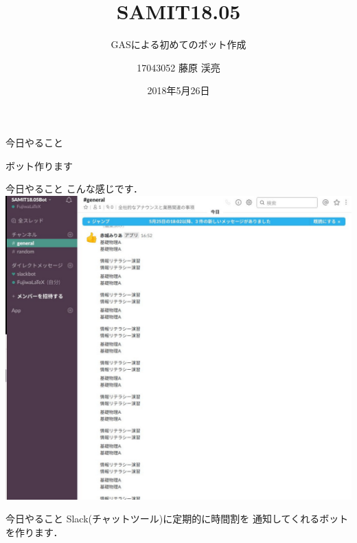 \documentclass[dvipdfmx,xcolor={svgnames}]{beamer}
\title{SAMIT18.05}
\subtitle{GASによる初めてのボット作成}
\author{17043052 藤原 渓亮}
\date{2018年5月26日}
\begin{document}
  \maketitle
  \begin{frame}{今日やること}
    \begin{center}
      \Huge ボット作ります
    \end{center}
  \end{frame}
  \begin{frame}{今日やること}
    \huge こんな感じです．
    \includegraphics[width=\hsize]{sc01.jpg}
  \end{frame}
  \begin{frame}{今日やること}
    \huge Slack(チャットツール)に定期的に時間割を
    通知してくれるボットを作ります．
  \end{frame}
\end{document}
